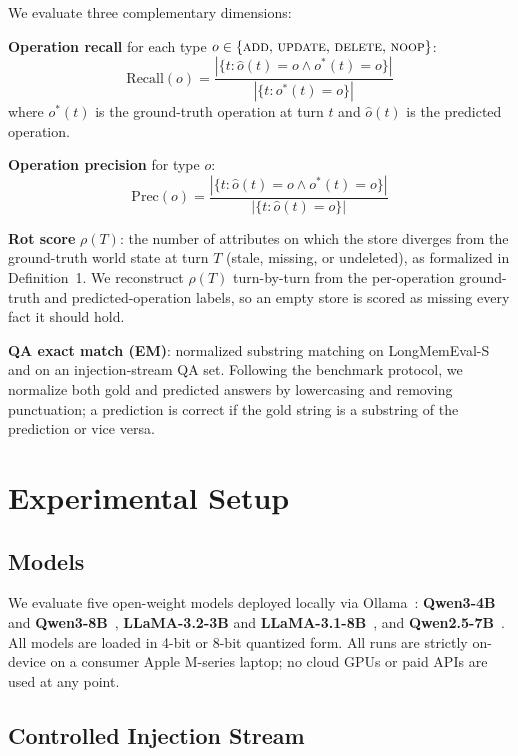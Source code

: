 \documentclass[10pt, twocolumn]{article}
\begin{document}
We evaluate three complementary dimensions:

\textbf{Operation recall} for each type
$o \in \{\textsc{add},\,\textsc{update},\,\textsc{delete},\,\textsc{noop}\}$:
\[
  \text{Recall}(o) = \frac{|\{t : \hat{o}(t) = o \land o^*(t) = o\}|}{|\{t : o^*(t) = o\}|}
\]
where $o^*(t)$ is the ground-truth operation at turn $t$ and $\hat{o}(t)$
is the predicted operation.

\textbf{Operation precision} for type $o$:
\[
  \text{Prec}(o) = \frac{|\{t : \hat{o}(t) = o \land o^*(t) = o\}|}{|\{t : \hat{o}(t) = o\}|}
\]

\textbf{Rot score} $\rho(T)$: the number of attributes on which the store
diverges from the ground-truth world state at turn $T$ (stale, missing, or
undeleted), as formalized in Definition~1.
We reconstruct $\rho(T)$ turn-by-turn from the per-operation ground-truth
and predicted-operation labels, so an empty store is scored as missing every
fact it should hold.

\textbf{QA exact match (EM)}: normalized substring matching on
LongMemEval-S~\cite{wu2024longmemeval} and on an injection-stream QA set.
Following the benchmark protocol, we normalize both gold and predicted
answers by lowercasing and removing punctuation; a prediction is correct if
the gold string is a substring of the prediction or vice versa.

\section{Experimental Setup}
\label{sec:setup}

\subsection{Models}

We evaluate five open-weight models deployed locally via
Ollama~\cite{ollama2024}:
\textbf{Qwen3-4B} and \textbf{Qwen3-8B}~\cite{qwen3},
\textbf{LLaMA-3.2-3B} and \textbf{LLaMA-3.1-8B}~\cite{llama3},
and \textbf{Qwen2.5-7B}~\cite{qwen25}.
All models are loaded in 4-bit or 8-bit quantized form.
All runs are strictly on-device on a consumer Apple M-series laptop;
no cloud GPUs or paid APIs are used at any point.

\subsection{Controlled Injection Stream}
\label{sec:stream}
\end{document}
